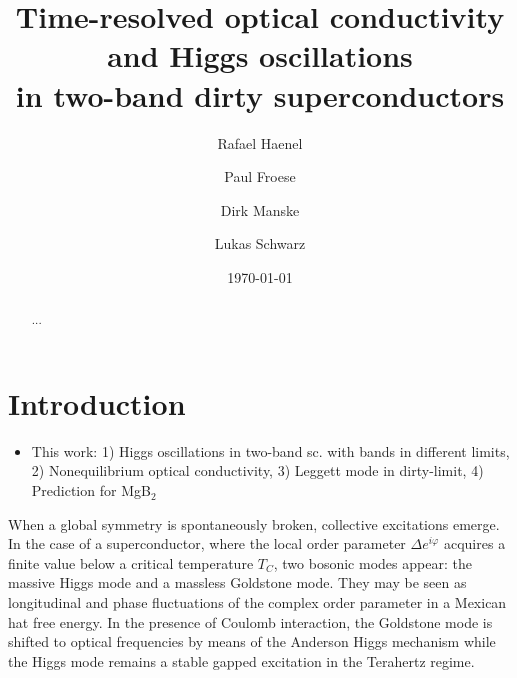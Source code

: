\documentclass[aps,prb,reprint,noeprint,superscriptaddress]{revtex4-1}
\begin{document}
\title{Time-resolved optical conductivity and Higgs oscillations\\in two-band dirty superconductors}

\author{Rafael Haenel}

\author{Paul Froese}


\author{Dirk Manske}

\author{Lukas Schwarz}


\date{\today}

\begin{abstract}
...
\end{abstract}




\maketitle


\section{Introduction}
\label{sec:introduction}

\begin{itemize}
	\item This work: 1) Higgs oscillations in two-band sc. with bands in different limits, 2) Nonequilibrium optical conductivity, 3) Leggett mode in dirty-limit, 4) Prediction for MgB$_2$
\end{itemize}

When a global symmetry is spontaneously broken, collective excitations emerge.
In the case of a superconductor, where the local order parameter $\Delta
e^{i\varphi}$ acquires a
finite value below a critical temperature $T_C$, two bosonic modes appear: the
massive Higgs mode and a massless Goldstone mode. They may be seen as
longitudinal and phase fluctuations of the complex order parameter in a Mexican
hat free energy. In the presence of Coulomb interaction, the Goldstone mode is
shifted to optical frequencies
by means of the Anderson Higgs mechanism while the Higgs mode remains
a stable gapped excitation in the Terahertz regime.
\end{document}
